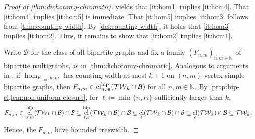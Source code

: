 \documentclass[11pt, DIV=15]{scrarticle}
\theoremstyle{definition}
\theoremstyle{plain}
\theoremstyle{remark}
\newcommand{\Bb}{{\cal B}}
\newcommand{\Cc}{{\cal C}}
\DeclareMathOperator{\tw}{tw}
\DeclareMathOperator{\cl}{cl}
\newcommand{\bbN}{\mathbb{N}}
\begin{document}
	\begin{proof}[Proof of \cref{thm:dichotomy-chromatic}]
		 yields that \ref{it:hom1} implies \ref{it:hom4}.
		That \ref{it:hom4} implies \ref{it:hom5} is immediate.
		That \ref{it:hom5} implies \ref{it:hom3} follows from \cref{thm:counting-width}.
		By \cref{def:counting-width},
		it holds that \ref{it:hom3} implies \ref{it:hom2}.
		Thus, it remains to show that \ref{it:hom2} implies \ref{it:hom1}.
		
		Write $\mathcal{B}$ for the class of all bipartite graphs and fix a family $(F_{n,m})_{n,m \in \bbN}$ of bipartite multigraphs, as in \cref{thm:dichotomy-chromatic}.
		Analogous to arguments in \cite{dvorak_recognizing_2010},
		if $\hom_{F_{n,m}, n,m}$ has counting width at most $k+1$  on $(n,m)$-vertex simple bipartite graphs,
		then $F_{n,m} \in \cl^{\textup{bip}}_{n,m}(\mathcal{TW}_k \cap \mathcal{B})$ for all $n,m \in \bbN$.
		By \cref{prop:bip-cl,lem:non-uniform-closure},
		for $\ell \coloneqq \min\{n,m\}$ sufficiently larger than $k$,
		\[
			F_{n,m} 
			\in \cl^{\textup{bip}}_{n,m}(\mathcal{TW}_k \cap \mathcal{B}) \cap \mathcal{B}
			\subseteq \cl^{\textup{bip}}_{\ell,\ell}(\mathcal{TW}_k \cap \mathcal{B})  \cap \mathcal{B}
			\subseteq \cl_\ell(\mathcal{TW}_k \cap \mathcal{B})  \cap \mathcal{B}
			\subseteq \cl_\ell(\mathcal{TW}_k) \cap \mathcal{B}
			\subseteq \mathcal{TW}_k.
		\]
		Hence, the $F_{n,m}$ have bounded treewidth.

\end{proof}
\end{document}
